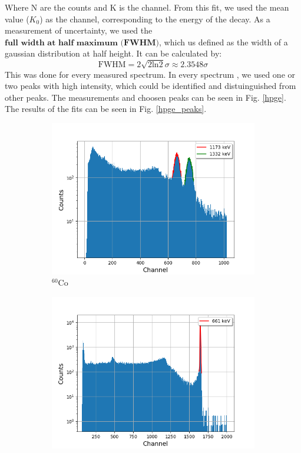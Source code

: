 Where N are the counts and K is the channel.
From this fit, we used the mean value ($K_0$) as the channel, corresponding to the energy of the decay.
As a measurement of uncertainty, we used the $\textbf{full width at half maximum (FWHM)}$, which us defined as the width of a gaussian distribution at half height.
It can be calculated by:
\begin{equation}
\text{FWHM} = 2 \sqrt{2 \text{ln} 2} \sigma \approx 2.3548 \sigma
\end{equation}
This was done for every measured spectrum.
In every spectrum , we used one or two peaks with high intensity, which could be identified and distuinguished from other peaks.
The measurements and choosen peaks can be seen in Fig. \ref{hpge}.
The results of the fits can be seen in Fig. \ref{hpge_peaks}.

\begin{figure}[h]
\begin{subfigure}{.5\textwidth}
  \centering
  \includegraphics[width=.9\linewidth]{../Plots/hpge_co.png}
  \caption{$^{60}\text{Co}$}
\end{subfigure}%
\begin{subfigure}{.5\textwidth}
  \centering
  \includegraphics[width=.9\linewidth]{../Plots/hpge_cs.png}

\end{subfigure}
\end{figure}
